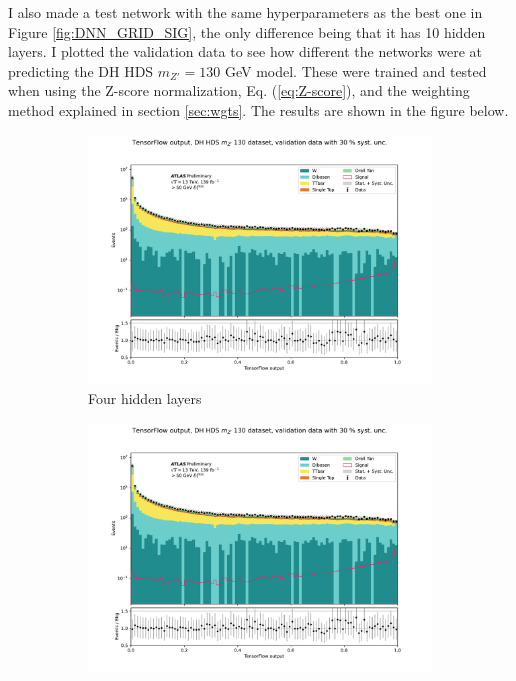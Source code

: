 \documentclass[14pt, a4paper]{book}
\begin{document}
\newpage\noindent I also made a test network with the same hyperparameters as the best one in Figure \ref{fig:DNN_GRID_SIG}, the only difference being that it has 10 hidden layers.
I plotted the validation data to see how different the networks were at predicting the DH HDS $m_{Z'}=130$ GeV model. 
These were trained and tested when using the Z-score normalization, Eq. (\ref{eq:Z-score}), and the weighting method explained in section \ref{sec:wgts}. The results are shown in the figure below.
\graphicspath{{../../../Plots/DeepNeuralNetwork/FULL/BEST_GRID/DH_HDS_mZp_130/}}
\begin{figure}[!ht]
	\centering
	\begin{subfigure}[b]{0.49\textwidth}
        \centering
        \includegraphics[width=1\textwidth]{VAL.pdf}
        \caption{Four hidden layers}
     \end{subfigure}
     \hfill\graphicspath{{../../../Plots/DeepNeuralNetwork/FULL/10_HIDDEN_LAYERS/DH_HDS_mZp_130/}}
     \begin{subfigure}[b]{0.49\textwidth}
        \centering
        \includegraphics[width=1\textwidth]{VAL.pdf}

\end{subfigure}
\end{figure}
\end{document}
